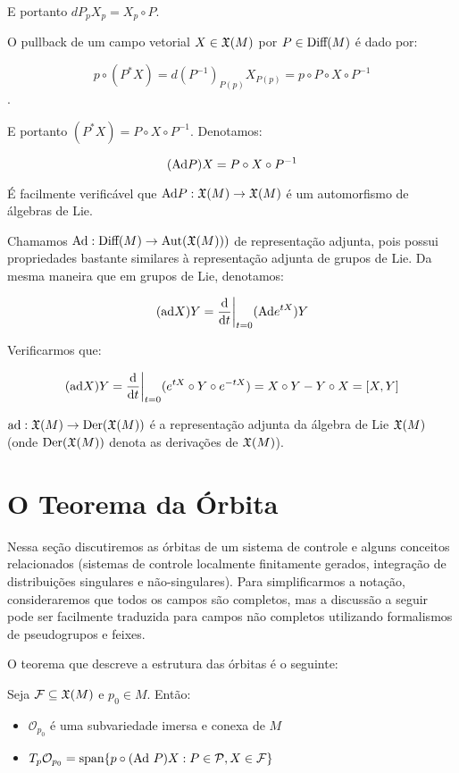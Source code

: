 E portanto $dP_p X_p = X_p \circ P$.

O pullback de um campo vetorial $X \in \mathfrak{X}(M)$ por $P \in \text{Diff}(M)$ é dado por:

$$p \circ (P^* X) = d(P^{-1})_{P(p)} X_{P(p)} =  p \circ P \circ X \circ P^{-1}$$.

E portanto $(P^* X) = P \circ X \circ P^{-1}$.
Denotamos:

$$(\text{Ad} P) X = P \circ X \circ P^{-1}$$

É facilmente verificável que $\text{Ad} P:\mathfrak{X}(M) \to \mathfrak{X}(M)$ é um automorfismo de
álgebras de Lie.

Chamamos $\text{Ad} : \text{Diff}(M) \to \text{Aut}(\mathfrak{X}(M)))$ de representação adjunta,
pois possui propriedades bastante similares à representação adjunta de
grupos de Lie. Da mesma maneira que em grupos de Lie, denotamos:

$$(\text{ad} X) Y = \frac{\text{d} }{\text{d} t}\bigg|_{t=0} (\text{Ad} e^{tX}) Y$$

Verificarmos que:

$$(\text{ad} X) Y = \frac{\text{d} }{\text{d} t}\bigg|_{t=0}
(e^{tX} \circ Y \circ e^{-tX}) = X \circ Y - Y \circ X = [X,Y]$$

$\text{ad} : \mathfrak{X}(M) \to \text{Der}(\mathfrak{X}(M))$ é a representação adjunta da álgebra de Lie $\mathfrak{X}(M)$ (onde
$\text{Der}(\mathfrak{X}(M))$ denota as derivações de $\mathfrak{X}(M)$).

\section{O Teorema da Órbita}

Nessa seção discutiremos as órbitas de um sistema de controle
e alguns conceitos relacionados (sistemas de controle localmente finitamente gerados,
integração de distribuições singulares e não-singulares).
Para simplificarmos a notação, consideraremos que todos
os campos são completos, mas a discussão a seguir pode ser facilmente
traduzida para campos não completos utilizando formalismos
de pseudogrupos e feixes.

O teorema que descreve a estrutura das órbitas é o seguinte:

\begin{theorem}
    Seja $\mathcal{F} \subseteq \mathfrak{X}(M)$ e $p_0 \in M$. Então:

    \begin{itemize}
        \item $\mathcal{O}_{p_0}$ é uma subvariedade imersa e conexa de $M$
        \item $T_p \mathcal{O}_{p_0} = \text{span}\{ p  \circ (\text{Ad}\ P) X : P \in \mathcal{P}, X \in \mathcal{F}\}$
    \end{itemize}
\end{theorem}

